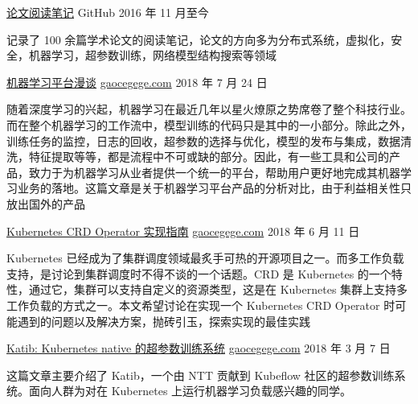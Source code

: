 

\begin{cventries}
  \cventry
    {}
    {\href{https://github.com/gaocegege/papers-notebook}{论文阅读笔记}}
    {GitHub}
    {2016 年 11 月至今}
    {
      \begin{cvitems} %
        \item 记录了 100 余篇学术论文的阅读笔记，论文的方向多为分布式系统，虚拟化，安全，机器学习，超参数训练，网络模型结构搜索等领域
      \end{cvitems}
    }

  \cventry
    {}
    {\href{http://t.cn/Eh7yABv}{机器学习平台漫谈}}
    {\href{http://gaocegege.com}{gaocegege.com}}
    {2018 年 7 月 24 日}
    {
      \begin{cvitems} %
        \item {
          随着深度学习的兴起，机器学习在最近几年以星火燎原之势席卷了整个科技行业。而在整个机器学习的工作流中，模型训练的代码只是其中的一小部分。除此之外，训练任务的监控，日志的回收，超参数的选择与优化，模型的发布与集成，数据清洗，特征提取等等，都是流程中不可或缺的部分。因此，有一些工具和公司的产品，致力于为机器学习从业者提供一个统一的平台，帮助用户更好地完成其机器学习业务的落地。这篇文章是关于机器学习平台产品的分析对比，由于利益相关性只放出国外的产品
        }
      \end{cvitems}
    }

  \cventry
    {}
    {\href{http://gaocegege.com/Blog/kubernetes/operator}{Kubernetes CRD Operator 实现指南}}
    {\href{http://gaocegege.com}{gaocegege.com}}
    {2018 年 6 月 11 日}
    {
      \begin{cvitems} %
        \item {
          Kubernetes 已经成为了集群调度领域最炙手可热的开源项目之一。而多工作负载支持，是讨论到集群调度时不得不谈的一个话题。CRD 是 Kubernetes 的一个特性，通过它，集群可以支持自定义的资源类型，这是在 Kubernetes 集群上支持多工作负载的方式之一。本文希望讨论在实现一个 Kubernetes CRD Operator 时可能遇到的问题以及解决方案，抛砖引玉，探索实现的最佳实践
        }
      \end{cvitems}
    }

  \cventry
    {}
    {\href{http://t.cn/Eh7UCQx}{Katib: Kubernetes native 的超参数训练系统}}
    {\href{http://gaocegege.com}{gaocegege.com}}
    {2018 年 3 月 7 日}
    {
      \begin{cvitems} %
        \item {
          这篇文章主要介绍了 Katib，一个由 NTT 贡献到 Kubeflow 社区的超参数训练系统。面向人群为对在 Kubernetes 上运行机器学习负载感兴趣的同学。
        }
      \end{cvitems}
    }
\end{cventries}

